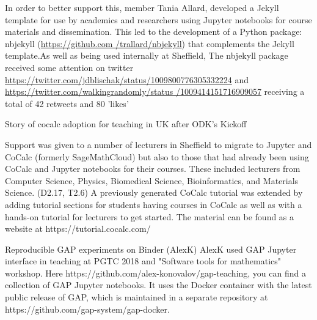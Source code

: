 \begin{Aim 1}
In order to better support this, \ODK member Tania Allard, developed a Jekyll template for use by academics and researchers using Jupyter 
notebooks for course materials and dissemination. This led to the development of a Python package: nbjekyll (\url{https://github.com
/trallard/nbjekyll}) that complements the Jekyll template.As well as being used internally at Sheffield, The nbjekyll package received some 
attention on twitter \url{https://twitter.com/jdblischak/status/1009800776305332224} and \url{https://twitter.com/walkingrandomly/status
/1009414151716909057} receiving a total of 42 retweets and 80 'likes'%


Story of cocalc adoption for teaching in UK after ODK's Kickoff
            
Support was given to a number of lecturers in Sheffield to migrate to Jupyter and CoCalc (formerly SageMathCloud) but also to those that had 
already been using CoCalc and Jupyter notebooks for their courses. These included lecturers from Computer Science, Physics, Biomedical 
Science, Bioinformatics, and Materials Science. (D2.17, T2.6) A previously generated CoCalc tutorial was extended by adding tutorial 
sections for students having courses in CoCalc as well as with a hands-on tutorial for lecturers to get started. The material can be found 
as a website at https://tutorial.cocalc.com/ 



Reproducible GAP experiments on Binder (AlexK)
AlexK %
used GAP Jupyter interface in teaching at PGTC 2018 and "Software tools for mathematics" workshop.
Here https://github.com/alex-konovalov/gap-teaching, you can find a collection of GAP Jupyter notebooks. It uses the Docker container with 
the latest public release of GAP, which is maintained in a separate repository at https://github.com/gap-system/gap-docker.


\end{Aim 1}
